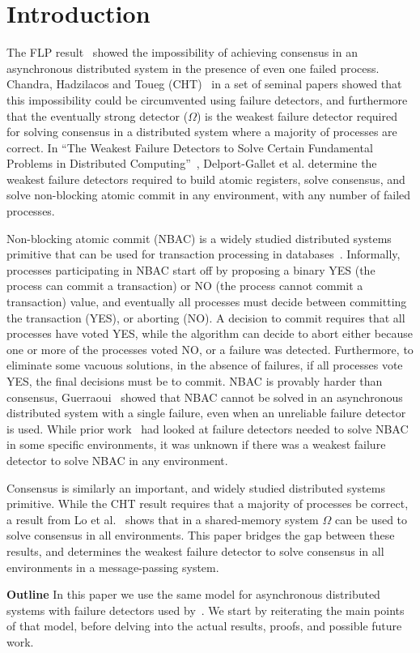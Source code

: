 \section{Introduction}
The FLP result~\cite{fischer1985impossibility} showed the impossibility of achieving consensus in an asynchronous
distributed system in the presence of even one failed process. Chandra, Hadzilacos and
Toueg (CHT)~\cite{chandra1996unreliable, chandra1996weakest} in a set of seminal papers showed that this impossibility could
be circumvented using failure detectors, and furthermore that the eventually strong detector ($\Omega$) is the
weakest failure detector required for solving consensus in a distributed system where a majority of processes are
correct. In ``The Weakest Failure Detectors to Solve Certain Fundamental Problems in Distributed
Computing''~\cite{delporte2004weakest}, Delport-Gallet et al. determine the weakest failure detectors required to build
atomic registers, solve consensus, and solve non-blocking atomic commit in any environment, \ie with any number of
failed processes.

Non-blocking atomic commit (NBAC) is a widely studied distributed systems primitive that can be used for transaction
processing in databases~\cite{gray1978notes}. Informally, processes participating in NBAC start off by proposing a
binary YES (the process can commit a transaction) or NO (the process cannot commit a transaction) value, and eventually
all processes must decide between committing the transaction (\ie YES), or aborting (\ie NO). A decision to commit
requires that all processes have voted YES, while the algorithm can decide to abort either because one or more of the
processes voted NO, or a failure was detected. Furthermore, to eliminate some vacuous solutions, in the absence of
failures, if all processes vote YES, the final decisions must be to commit. NBAC is provably harder than consensus,
Guerraoui~\cite{guerraoui1995revisiting} showed that  NBAC
cannot be solved in an asynchronous distributed system with a single failure, even when an unreliable failure detector is
used. While prior work~\cite{guerraoui2002weakest} had looked at failure detectors needed to solve NBAC in some specific
environments, it was unknown if there was a weakest failure detector to solve NBAC in any environment.

Consensus is similarly an important, and widely studied distributed systems primitive. While the CHT result requires
that a majority of processes be correct, a result from Lo et al.~\cite{lo1994using} shows that in a shared-memory system
$\Omega$ can be used to solve consensus in all environments. This paper bridges the gap between these results,
and determines the weakest failure detector to solve consensus in all environments in a message-passing system.

\textbf{Outline} In this paper we use the same model for asynchronous distributed systems with failure detectors used
by~\cite{chandra1996unreliable, chandra1996weakest}. We start by reiterating the main points of that model, before
delving into the actual results, proofs, and possible future work.

